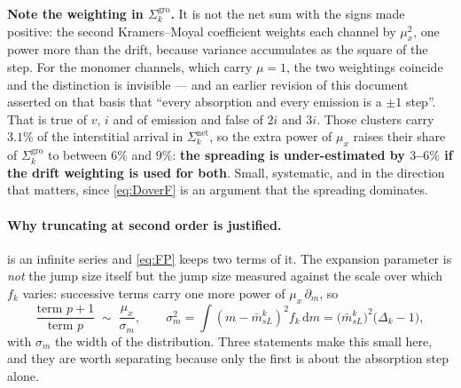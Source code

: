 \documentclass{article}
\begin{document}
\textbf{Note the weighting in $\Sigma^{\mathrm{gro}}_k$.} It is not the net sum
with the signs made positive: the second Kramers--Moyal coefficient weights each
channel by $\mu_x^{2}$, one power more than the drift, because variance
accumulates as the square of the step. For the monomer channels, which carry
$\mu=1$, the two weightings coincide and the distinction is invisible --- and an
earlier revision of this document asserted on that basis that ``every absorption
and every emission is a $\pm1$ step''. That is true of $v$, $i$ and of emission
and false of $2i$ and $3i$. Those clusters carry $3.1\%$ of the interstitial
arrival in $\Sigma^{\mathrm{net}}_k$, so the extra power of $\mu_x$ raises their
share of $\Sigma^{\mathrm{gro}}_k$ to between $6\%$ and $9\%$: \textbf{the
spreading is under-estimated by $3$--$6\%$ if the drift weighting is used for
both}. Small, systematic, and in the direction that matters, since
\cref{eq:DoverF} is an argument that the spreading dominates.

\paragraph{Why truncating at second order is justified.}  is an
infinite series and \cref{eq:FP} keeps two terms of it. The expansion parameter
is \emph{not} the jump size itself but the jump size measured against the scale
over which $f_k$ varies: successive terms carry one more power of
$\mu_x\,\partial_m$, so
\begin{equation}
  \frac{\text{term }p+1}{\text{term }p}\;\sim\;\frac{\mu_x}{\sigma_m},
  \qquad
  \sigma_m^{2}=\int (m-\bar m^k_{sL})^{2}f_k\,\mathrm dm
             =\bigl(\bar m^k_{sL}\bigr)^{2}\bigl(\Delta_k-1\bigr),
  \label{eq:KMsmall}
\end{equation}
with $\sigma_m$ the width of the distribution. Three statements make this small
here, and they are worth separating because only the first is about the
absorption step alone.
\end{document}
